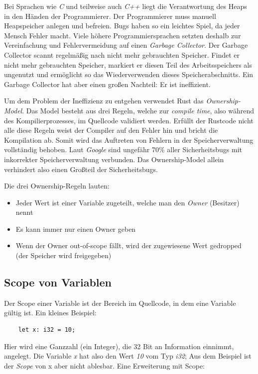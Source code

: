 Bei Sprachen wie \textit{C} und teilweise auch \textit{C++} liegt die Verantwortung des Heaps in den Händen der Programmierer. Der Programmierer
muss manuell Heapspeicher anlegen und befreien. Bugs haben so ein leichtes Spiel, da jeder Mensch Fehler macht. Viele höhere Programmiersprachen setzten
deshalb zur Vereinfachung und Fehlervermeidung auf einen \textit{Garbage Collector}. Der Garbage Collector scannt regelmäßig nach nicht mehr
gebrauchten Speicher. Findet er nicht mehr gebrauchten Speicher, markiert er diesen Teil des Arbeitsspeichers als ungenutzt und ermöglicht so 
das Wiederverwenden dieses Speicherabschnitts. Ein Garbage Collector hat aber einen großen Nachteil: Er ist ineffizient.

Um dem Problem der Ineffizienz zu entgehen verwendet Rust das \textit{Ownership-Model}. Das Model besteht
aus drei Regeln, welche zur \textit{compile time}, also während des Kompilierprozesses, im Quellcode validiert werden. Erfüllt der Rustcode nicht
alle diese Regeln weist der Compiler auf den Fehler hin und bricht die Kompilation ab. Somit wird das Auftreten von Fehlern in der Speicherverwaltung
vollständig behoben. Laut \textit{Google} sind ungefähr 70\% aller Sicherheitsbugs mit inkorrekter Speicherverwaltung verbunden. Das Ownership-Model allein
verhindert also einen Großteil der Sicherheitsbugs.

Die drei Ownership-Regeln lauten:

\begin{itemize}
    \item Jeder Wert ist einer Variable zugeteilt, welche man den \textit{Owner} (Besitzer) nennt
    \item Es kann immer nur einen Owner geben
    \item Wenn der Owner out-of-scope fällt, wird der zugewiesene Wert gedropped (der Speicher wird freigegeben)
\end{itemize}

\subsection{Scope von Variablen}
Der Scope einer Variable ist der Bereich im Quellcode, in dem eine Variable gültig ist. Ein kleines Beispiel:

\begin{lstlisting}
    let x: i32 = 10;
\end{lstlisting}

Hier wird eine Ganzzahl (ein Integer), die 32 Bit an Information einnimmt, angelegt. Die Variable \textit{x} hat also den Wert \textit{10} vom Typ \textit{i32};
Aus dem Beispiel ist der \textit{Scope} von x aber nicht ablesbar. Eine Erweiterung mit Scope:

